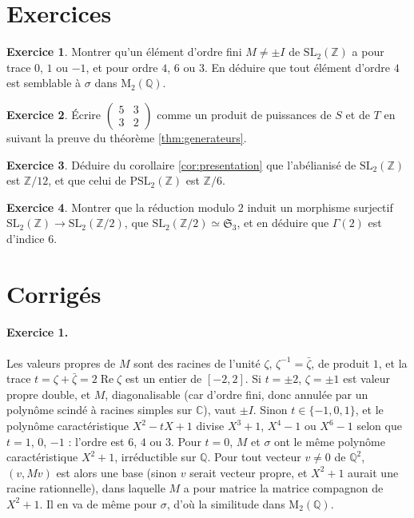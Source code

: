 \documentclass[11pt,a4paper]{article}
\theoremstyle{plain}
\theoremstyle{definition}
\newtheorem{exercice}{Exercice}
\theoremstyle{remark}
\newcommand{\Z}{\mathbb{Z}}
\newcommand{\Q}{\mathbb{Q}}
\newcommand{\C}{\mathbb{C}}
\newcommand{\SL}{\mathrm{SL}}
\newcommand{\PSL}{\mathrm{PSL}}
\begin{document}
\section{Exercices}

\begin{exercice}\label{exo:ordres}
Montrer qu'un élément d'ordre fini $M\neq\pm I$ de $\SL_2(\Z)$ a pour trace $0$, $1$ ou $-1$, et pour ordre $4$, $6$ ou $3$. En déduire que tout élément d'ordre $4$ est semblable à $\sigma$ dans $\mathrm M_2(\Q)$.
\end{exercice}

\begin{exercice}\label{exo:mot}
Écrire $\begin{pmatrix}5&3\\3&2\end{pmatrix}$ comme un produit de puissances de $S$ et de $T$ en suivant la preuve du théorème \ref{thm:generateurs}.
\end{exercice}

\begin{exercice}\label{exo:abelianise}
Déduire du corollaire \ref{cor:presentation} que l'abélianisé de $\SL_2(\Z)$ est $\Z/12$, et que celui de $\PSL_2(\Z)$ est $\Z/6$.
\end{exercice}

\begin{exercice}\label{exo:indice}
Montrer que la réduction modulo $2$ induit un morphisme surjectif $\SL_2(\Z)\to\SL_2(\Z/2)$, que $\SL_2(\Z/2)\simeq\mathfrak S_3$, et en déduire que $\Gamma(2)$ est d'indice $6$.
\end{exercice}

\section{Corrigés}

\paragraph{Exercice 1.} Les valeurs propres de $M$ sont des racines de l'unité $\zeta$, $\zeta^{-1}=\bar\zeta$, de produit $1$, et la trace $t=\zeta+\bar\zeta=2\operatorname{Re}\zeta$ est un entier de $[-2,2]$. Si $t=\pm2$, $\zeta=\pm1$ est valeur propre double, et $M$, diagonalisable (car d'ordre fini, donc annulée par un polynôme scindé à racines simples sur $\C$), vaut $\pm I$. Sinon $t\in\{-1,0,1\}$, et le polynôme caractéristique $X^2-tX+1$ divise $X^3+1$, $X^4-1$ ou $X^6-1$ selon que $t=1$, $0$, $-1$ : l'ordre est $6$, $4$ ou $3$. Pour $t=0$, $M$ et $\sigma$ ont le même polynôme caractéristique $X^2+1$, irréductible sur $\Q$. Pour tout vecteur $v\neq0$ de $\Q^2$, $(v,Mv)$ est alors une base (sinon $v$ serait vecteur propre, et $X^2+1$ aurait une racine rationnelle), dans laquelle $M$ a pour matrice la matrice compagnon de $X^2+1$. Il en va de même pour $\sigma$, d'où la similitude dans $\mathrm M_2(\Q)$.
\end{document}
